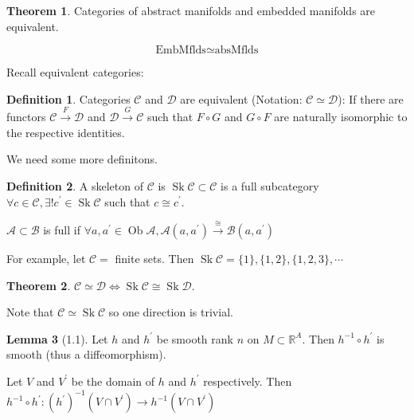 \documentclass{article}
\theoremstyle{definition}
\newtheorem*{definition}{Definition}
\newtheorem{theorem}{Theorem}
\newtheorem{lemma}[theorem]{Lemma}
\begin{document}
    \begin{theorem}
        Categories of abstract manifolds and embedded manifolds are equivalent.

        \[
            \text{EmbMflds} \simeq \text{absMflds}  
        \]
    \end{theorem}

    Recall equivalent categories:

    \begin{definition}
        Categories \(\mathcal{C}\) and \(\mathcal{D}\) are equivalent (Notation: \(\mathcal{C} \simeq \mathcal{D}\)): If there are functors \(\mathcal{C} \xrightarrow{F} \mathcal{D}\) and \(\mathcal{D} \xrightarrow{G} \mathcal{C}\) such that \(F \circ G\) and \(G \circ F\) are naturally isomorphic to the respective identities.
    \end{definition}

    We need some more definitons.

    \begin{definition}
        A skeleton of \(\mathcal{C}\) is \(\operatorname{Sk} \mathcal{C} \subset \mathcal{C}\) is a full subcategory \(\forall c\in \mathcal{C}, \exists ! c^{\prime} \in \operatorname{Sk} \mathcal{C}\) such that \(c \cong c^{\prime}\).

        \(\mathcal{A} \subset \mathcal{B}\) is full if \(\forall a,a^{\prime} \in \operatorname{Ob} \mathcal{A}, \mathcal{A}(a,a^{\prime}) \xrightarrow{\cong} \mathcal{B}(a,a^{\prime})\) 
    \end{definition}

    For example, let \(\mathcal{C} =\) finite sets. Then \(\operatorname{Sk} \mathcal{C} = \{ 1 \}, \{ 1,2 \}, \{ 1,2,3 \}, \cdots\) 

    \begin{theorem}
        \(\mathcal{C} \simeq \mathcal{D} \iff \operatorname{Sk} \mathcal{C} \cong \operatorname{Sk} \mathcal{D}\).
    \end{theorem}

    Note that \(\mathcal{C} \simeq \operatorname{Sk} \mathcal{C}\) so one direction is trivial.

    \begin{lemma}
        [1.1] Let \(h\) and \(h^{\prime}\) be smooth rank \(n\) on \(M \subset \mathbb{R}^A\). Then \(h ^{-1} \circ  h^{\prime}\) is smooth (thus a diffeomorphism).
        
        Let \(V\) and \(V^{\prime}\) be the domain of \(h\) and \(h^{\prime}\) respectively. Then \(h ^{-1} \circ h^{\prime} : (h^{\prime})^{-1} (V\cap V^{\prime}) \to h ^{-1} (V \cap V^{\prime})\) 
    \end{lemma}
\end{document}
